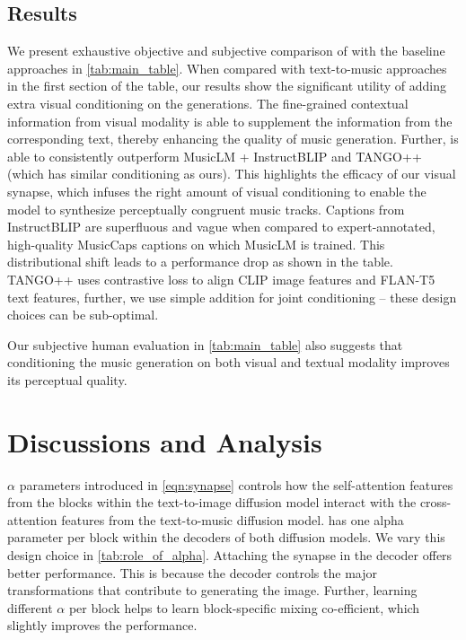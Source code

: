 \subsection{Results} \label{sec:main_results}
We present exhaustive objective and subjective comparison of \modelname with the baseline approaches in \cref{tab:main_table}.
When compared with text-to-music approaches in the first section of the table, our results show the significant utility of adding extra visual conditioning on the generations. The fine-grained contextual information from visual modality is able to supplement the information from the corresponding text, thereby enhancing the quality of music generation.
Further, \modelname is able to consistently outperform MusicLM + InstructBLIP and TANGO++ (which has similar conditioning as ours). This highlights the efficacy of our visual synapse, which infuses the right amount of visual conditioning to enable the model to synthesize perceptually congruent music tracks. Captions from InstructBLIP are superfluous and vague when compared to expert-annotated, high-quality MusicCaps captions on which MusicLM is trained. This distributional shift leads to a performance drop as shown in the table. TANGO++ uses contrastive loss to align CLIP image features and FLAN-T5 text features, further, we use simple addition for joint conditioning -- these design choices can be sub-optimal. 

Our subjective human evaluation in \cref{tab:main_table} also suggests that conditioning the music generation on both visual and textual modality improves its perceptual quality.

\section{Discussions and Analysis}

         

$\alpha$ parameters introduced in \cref{eqn:synapse} controls how the self-attention features from the blocks within the text-to-image diffusion model interact with the cross-attention features from the text-to-music diffusion model. \modelname has one alpha parameter per block within the decoders of both diffusion models. We vary this design choice in \cref{tab:role_of_alpha}. Attaching the synapse in the decoder offers better performance. This is because the decoder controls the major transformations that contribute to generating the image. Further, learning different $\alpha$ per block helps to learn block-specific mixing co-efficient, which slightly improves the performance. 

